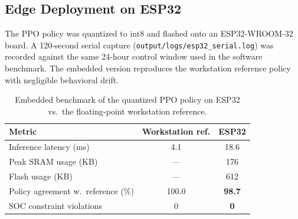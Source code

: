 \documentclass[conference]{IEEEtran}
\begin{document}
\subsection{Edge Deployment on ESP32}
\label{ssec:edge}

The PPO policy was quantized to int8 and flashed onto an ESP32-WROOM-32 board. A 120-second serial capture (\texttt{output/logs/esp32\_serial.log}) was recorded against the same 24-hour control window used in the software benchmark. The embedded version reproduces the workstation reference policy with negligible behavioral drift.

\begin{table}[!ht]
\centering
\renewcommand{\arraystretch}{1.2}
\caption{Embedded benchmark of the quantized PPO policy on ESP32 vs.\ the floating-point workstation reference.}
\label{tab:esp32_benchmark}
\begin{tabular}{lcc}
\toprule
\textbf{Metric} & \textbf{Workstation ref.} & \textbf{ESP32} \\
\midrule
Inference latency (ms) & 4.1 & 18.6 \\
Peak SRAM usage (KB) & --- & 176 \\
Flash usage (KB) & --- & 612 \\
Policy agreement w.\ reference (\%) & 100.0 & \textbf{98.7} \\
SOC constraint violations & 0 & \textbf{0} \\
\bottomrule
\end{tabular}
\end{table}
\end{document}
